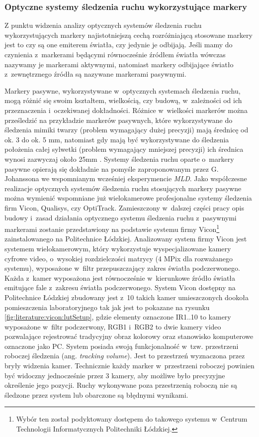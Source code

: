 \subsubsection*{Optyczne systemy śledzenia ruchu wykorzystujące markery}
Z punktu widzenia analizy optycznych systemów śledzenia ruchu wykorzystujących markery najistotniejszą cechą rozróżniającą stosowane markery jest to czy są one emiterem światła, czy jedynie je odbijają. Jeśli mamy do czynienia z~markerami będącymi równocześnie źródłem światła wówczas nazywamy je markerami aktywnymi, natomiast markery odbijające światło z~zewnętrznego źródła są nazywane markerami pasywnymi.

Markery pasywne, wykorzystywane w~optycznych systemach śledzenia ruchu, mogą różnić się swoim kształtem, wielkością, czy budową, w~zależności od ich przeznaczenia i~oczekiwanej dokładności. Różnice w~wielkości markerów można prześledzić na przykładzie markerów pasywnych, które wykorzystywane do śledzenia mimiki twarzy (problem wymagający dużej precyzji) mają średnicę od ok. 3 do ok. 5 mm, natomiast gdy mają być wykorzystywane do śledzenia położenia całej sylwetki (problem wymagający mniejszej precyzji) ich średnica wynosi zazwyczaj około 25mm . Systemy śledzenia ruchu oparte o~markery pasywne opierają się dokładnie na pomyśle zaproponowanym przez G. Johanssona we wspomnianym wcześniej eksperymencie \textsl{MLD}. Jako współczesne realizacje optycznych systemów śledzenia ruchu stosujących markery pasywne można wymienić wspomniane już wielokamerowe profesjonalne systemy śledzenia firm Vicon, Qualisys, czy OptiTrack. 
Zamieszczony w~dalszej części pracy opis budowy i~zasad działania optycznego systemu śledzenia ruchu z~pasywnymi markerami zostanie przedstawiony na podstawie systemu firmy Vicon\footnote{Wybór ten został podyktowany dostępem do takowego systemu w~Centrum Technologii Informatycznych Politechniki Łódzkiej.} zainstalowanego na Politechnice Łódzkiej. 
Analizowany system firmy Vicon jest systemem wielokamerowym, który wykorzystuje wyspecjalizowane kamery cyfrowe video, o~wysokiej rozdzielczości matrycy (4 MPix dla rozważanego systemu), wyposażone w~filtr przepuszczający zakres światła podczerwonego. Każda z~kamer wyposażona jest równocześnie w~kierunkowe źródło światła emitujące fale z~zakresu światła podczerwonego. System Vicon dostępny na Politechnice Łódzkiej zbudowany jest z~10 takich kamer umieszczonych dookoła pomieszczenia laboratoryjnego tak jak jest to pokazane na rysunku \ref{fig:literature:vicon:lutSetup}, gdzie elementy oznaczone IR1..10 to kamery wyposażone w~filtr podczerwony, RGB1 i~RGB2 to dwie kamery video pozwalające rejestrować tradycyjny obraz kolorowy oraz stanowisko komputerowe oznaczone jako PC. System posiada swoją funkcjonalność w~tzw. przestrzeni roboczej śledzenia (ang. \textsl{tracking volume}). Jest to przestrzeń wyznaczona przez bryły widzenia kamer. Technicznie każdy marker w~przestrzeni roboczej powinien być widoczny jednocześnie przez 3 kamery, aby możliwe było precyzyjne określenie jego pozycji. Ruchy wykonywane poza przestrzenią roboczą nie są śledzone przez system lub obarczone są błędnymi wynikami.

